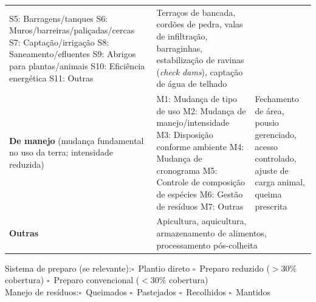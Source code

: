 \begin{table}[htbp]
\begin{tabular}{p{3cm}p{4cm}p{7cm}}
  S5: Barragens/tanques \newline
  S6: Muros/barreiras/paliçadas/cercas \newline
  S7: Captação/irrigação \newline
  S8: Saneamento/efluentes \newline
  S9: Abrigos para plantas/animais \newline
  S10: Eficiência energética \newline
  S11: Outras &
  Terraços de bancada, cordões de pedra, valas de infiltração, barraginhas, estabilização de ravinas (\textit{check dams}), captação de água de telhado \\
\addlinespace
\textbf{De manejo} \newline
(mudança fundamental no uso da terra; intensidade reduzida) &
  M1: Mudança de tipo de uso \newline
  M2: Mudança de manejo/intensidade \newline
  M3: Disposição conforme ambiente \newline
  M4: Mudança de cronograma \newline
  M5: Controle de composição de espécies \newline
  M6: Gestão de resíduos \newline
  M7: Outras &
  Fechamento de área, pousio gerenciado, acesso controlado, ajuste de carga animal, queima prescrita \\
\addlinespace
\textbf{Outras} &
  \multicolumn{2}{p{11cm}}{Apicultura, aquicultura, armazenamento de alimentos, processamento pós-colheita} \\
\bottomrule
\end{tabular}
\end{table}

\noindent Sistema de preparo (se relevante):\quad $\square$~Plantio direto \quad $\square$~Preparo reduzido ($>$30\% cobertura) \quad $\square$~Preparo convencional ($<$30\% cobertura)\\
Manejo de resíduos:\quad $\square$~Queimados \quad $\square$~Pastejados \quad $\square$~Recolhidos \quad $\square$~Mantidos

